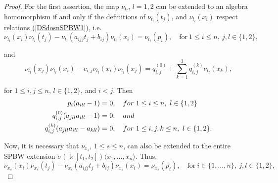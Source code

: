 \documentclass{amsart}
\theoremstyle{definition}
\theoremstyle{remark}
\numberwithin{equation}{section}
\begin{document}
\begin{proof}
For the first assertion, the map $\nu_{t_l}$, $l=1, 2$ can be extended to an algebra homomorphism if and only if the definitions of $\nu_{t_l}(t_j)$,  and $\nu_{t_l}(x_i)$ respect relations  {\rm (}\ref{DSdosnSPBW1}{\rm )}, i.e. 
\begin{equation*}
\nu_{t_l}(x_i)\nu_{t_l}(t_j) - \nu_{t_l}(a_{ijj}t_j+b_{ij})\nu_{t_l}(x_i) = \nu_{t_l}(p_i), \quad \text{for}\ 1\le i \le n,\  j, l \in \{1, 2\},
\end{equation*}

and 
\begin{equation*}
\nu_{t_l}(x_j)\nu_{t_l}(x_i)-c_{i,j}\nu_{t_l}(x_i)\nu_{t_l}(x_j) = q_{i,j}^{(0)}+\sum_{k=1}^{3}q_{i,j}^{(k)}\nu_{t_l}(x_k),
\end{equation*}

for $1\le i, j \le n$, $l \in \{1, 2\}$, and $i < j$. Then
\begin{align}
p_i(a_{ill}-1) = &\ 0, \quad {\rm for}\ 1\le i \le n, \ l \in \{1, 2\} \notag \\
q_{i,j}^{(0)}(a_{jll}a_{ill}-1) = &\ 0, \quad {\rm and} \label{firstsecondrel33n} \\
q_{i,j}^{(k)}(a_{jll}a_{ill}-a_{kll}) = &\ 0, \quad {\rm for}\  1\leq i, j, k \leq n, \ l \in \{1, 2\}. \notag 
\end{align}

Now, it is necessary that $\nu_{x_s}$, $1\leq s \leq n$,  can also be extended to the entire SPBW extension $\sigma(\Bbbk[t_1, t_2])\langle x_1, \ldots, x_n\rangle$. Thus,
\begin{equation}\label{mapvxtn}
\nu_{x_s}(x_i)\nu_{x_s}(t_j)-\nu_{x_s}(a_{ijj}t_j+b_{ij})\nu_{x_s}(x_i) = \nu_{x_s}(p_i), \quad \text{for}\ i\in\{1, \ldots, n\},\ j, l \in \{1, 2\},
\end{equation}


\end{proof}
\end{document}
